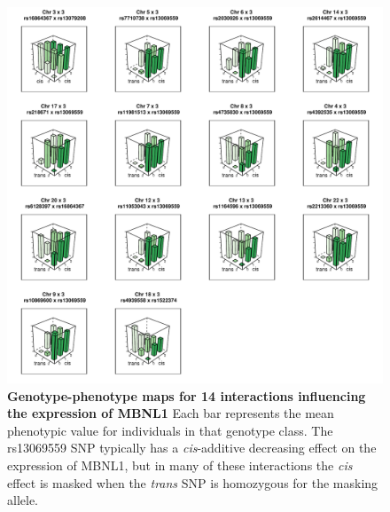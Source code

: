 \documentclass{article}
\begin{document}
\begin{figure}
	\centering
	\includegraphics[width=5in]{MBNL1_3D}
	\caption{\textbf{Genotype-phenotype maps for 14 interactions influencing the expression of MBNL1} Each bar represents the mean phenotypic value for individuals in that genotype class. The rs13069559 SNP typically has a \emph{cis}-additive decreasing effect on the expression of MBNL1, but in many of these interactions the \emph{cis} effect is masked when the \emph{trans} SNP is homozygous for the masking allele.}
	\label{fig:MBNL1_3D}
\end{figure}
\clearpage
\end{document}
